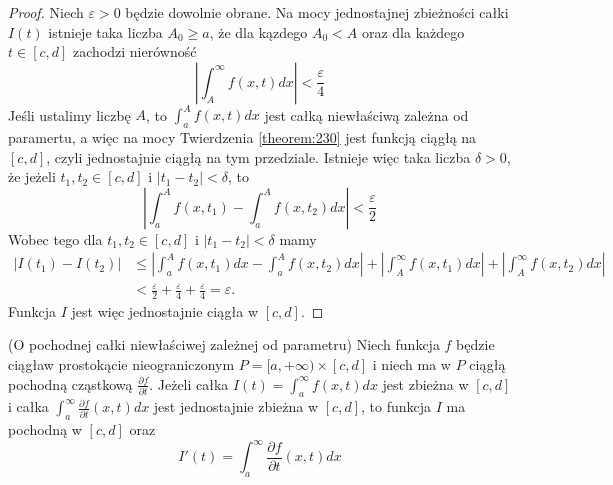 \documentclass[leqno]{article}
\begin{document}
\begin{justify}
\begin{proof}
    Niech $\varepsilon > 0$ będzie dowolnie obrane. Na mocy jednostajnej zbieżności całki $I(t)$ istnieje taka liczba $A_0 
    \geqslant a$, że dla kązdego $A_0 < A$ oraz dla każdego $t \in [c,d]$ zachodzi nierówność 
    \[
        \left| \int_{A}^{\infty}f(x,t)dx \right| < \frac{\varepsilon}{4}
    \]
    Jeśli ustalimy liczbę $A$, to $\int_{a}^{A}f(x,t)dx$ jest całką niewłaściwą zależna od paramertu, a więc 
    na mocy Twierdzenia \ref{theorem:230} jest funkcją ciągłą na $[c,d]$, czyli jednostajnie ciągłą na tym przedziale.
    Istnieje więc taka liczba $\delta > 0$, że jeżeli $t_1,t_2 \in [c,d]$ i $|t_1 - t_2| < \delta$, to
    \[
        \left| \int_{a}^{A}f(x, t_1) - \int_{a}^{A}f(x,t_2)dx \right| < \frac{\varepsilon}{2}
    \]
    Wobec tego dla $t_1,t_2 \in [c,d]$ i $|t_1 - t_2| < \delta$ mamy 
    \[
        \begin{aligned}
            |I(t_1) - I(t_2)| &\leqslant \left| \int_{a}^{A}f(x,t_1)dx - \int_{a}^{A}f(x,t_2)dx \right| + \left| \int_{A}^{\infty} f(x,t_1)dx \right| + \left| \int_{A}^{\infty} f(x,t_2)dx \right| \\
            &< \frac{\varepsilon}{2} + \frac{\varepsilon}{4} + \frac{\varepsilon}{4} = \varepsilon.
        \end{aligned}
    \]
    Funkcja $I$ jest więc jednostajnie ciągła w $[c,d]$.
\end{proof}

\begin{theorem}
{
    (O pochodnej całki niewłaściwej zależnej od parametru)
    Niech funkcja $f$ będzie ciągław prostokącie nieograniczonym $P = [a, +\infty) \times [c,d]$ i niech ma w $P$
    ciągłą pochodną cząstkową $\frac{\partial f}{\partial t}$. Jeżeli całka $I(t) = \int_{a}^{\infty}f(x,t)dx$ jest zbieżna w $[c,d]$
    i całka $\int_{a}^{\infty}\frac{\partial f}{\partial t}(x,t)dx$ jest jednostajnie zbieżna w $[c,d]$, to funkcja $I$ ma pochodną w $[c,d]$ oraz 
    \[
        I'(t) = \int_{a}^{\infty}\frac{\partial f}{\partial t}(x,t)dx
    \]
}
\end{theorem}


\end{justify}
\end{document}
